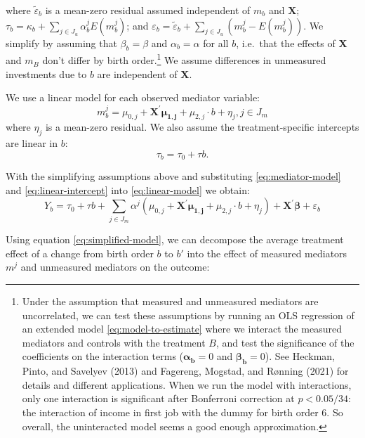 \documentclass[
]{article}
\theoremstyle{definition}
\theoremstyle{definition}
\theoremstyle{definition}
\theoremstyle{definition}
\theoremstyle{remark}
\begin{document}
where \(\tilde{\varepsilon}_b\) is a mean-zero residual assumed independent of
\(m_b\) and \(\mathbf{X}\);
\(\tau_b = \kappa_b + \sum_{j \in J_u} \alpha_b^j E(m^j_b)\); and
\(\varepsilon_b = \tilde{\varepsilon}_b + \sum_{j \in J_u} (m^j_b - E(m^j_b))\).
We simplify by assuming that \(\beta_b = \beta\)
and \(\alpha_b = \alpha\) for all \(b\), i.e.~that the effects of \(\mathbf{X}\) and
\(m_B\) don't differ by birth order.\footnote{Under the assumption that measured and unmeasured mediators are
  uncorrelated, we can test these assumptions by running an OLS regression of an
  extended model \eqref{eq:model-to-estimate} where we interact the measured
  mediators and controls with the treatment \(B\), and test the significance of the
  coefficients on the interaction terms (\(\symbf{\alpha_b}=0\) and
  \(\symbf{\beta_b}=0\)). See Heckman, Pinto, and Savelyev (2013) and Fagereng, Mogstad, and Rønning (2021)
  for details and different applications. When we run the model with interactions,
  only one interaction is significant after Bonferroni correction at \(p < 0.05/34\):
  the interaction of income in first job with the dummy for birth order 6. So
  overall, the uninteracted model seems a good enough approximation.} We assume differences in
unmeasured investments due to \(b\) are independent of \(\mathbf{X}\).

We use a linear model for each observed mediator variable:
\begin{equation}
\label{eq:mediator-model}
m^j_b=\mu_{0,j}+\mathbf{X^\prime}\symbf{\mu_{1,j}}+\mu_{2,j}\cdot b+\eta_j, j \in J_m  
\end{equation}
where \(\eta_j\) is a mean-zero residual. We also assume the treatment-specific
intercepts are linear in \(b\):
\begin{equation}
\label{eq:linear-intercept}
\tau_b=\tau_{0}+\tau b.  
\end{equation}

With the simplifying assumptions above and substituting \eqref{eq:mediator-model}
and \eqref{eq:linear-intercept} into \eqref{eq:linear-model} we obtain:
\begin{equation}
\label{eq:simplified-model}
Y_b = \tau_0+\tau b + \sum_{j \in J_m} \alpha^j (\mu_{0,j}+\mathbf{X^\prime}\symbf{\mu_{1,j}}+\mu_{2,j}\cdot b+\eta_j) + \mathbf{X^\prime} \symbf{\beta} + \varepsilon_b 
\end{equation}

Using equation \eqref{eq:simplified-model}, we can decompose the average treatment
effect of a change from birth order \(b\) to \(b'\) into the effect of measured mediators
\(m^j\) and unmeasured mediators on the outcome:
\end{document}
